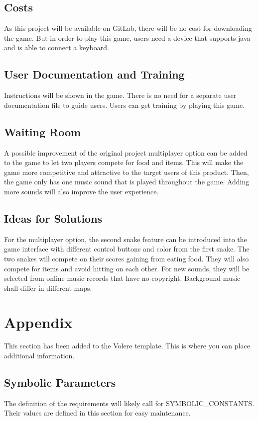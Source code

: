 \documentclass[12pt, titlepage]{article}
\begin{document}
\subsection{Costs}
    As this project will be available on GitLab, there will be no cost for downloading the game. But in order to play this game, users need a device that supports java and is able to connect a keyboard.
\subsection{User Documentation and Training}
    Instructions will be shown in the game. There is no need for a separate user documentation file to guide users. Users can get training by playing this game.
\subsection{Waiting Room}
	A possible improvement of the original project multiplayer option can be added to the game to let two players compete for food and items. This will make the game more competitive and attractive to the target users of this product. Then, the game only has one music sound that is played throughout the game. Adding more sounds will also improve the user experience.

\subsection{Ideas for Solutions}
    For the multiplayer option, the second snake feature can be introduced into the game interface with different control buttons and color from the first snake. The two snakes will compete on their scores gaining from eating food. They will also compete for items and avoid hitting on each other. For new sounds, they will be selected from online music records that have no copyright. Background music shall differ in different maps.




\newpage

\section{Appendix}

This section has been added to the Volere template.  This is where you can place
additional information.

\subsection{Symbolic Parameters}

The definition of the requirements will likely call for SYMBOLIC\_CONSTANTS.
Their values are defined in this section for easy maintenance.
\end{document}
